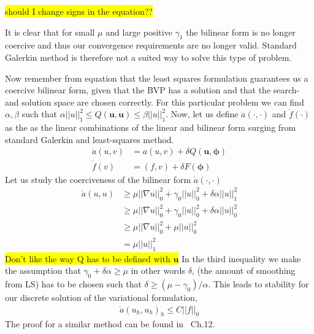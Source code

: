 \colorbox{yellow}{should I change signs in the equation?? } 


It is clear that for small $\mu$ and large positive $\gamma_1$ the bilinear form is no longer coercive and thus our convergence requirements are no longer valid. Standard Galerkin method is therefore not a suited way to solve this type of problem. 

Now remember from equation  that the least squares formulation guarantees us a coercive bilinear form, given that the BVP has a solution and that the search- and solution space are chosen correctly. For this particular problem we can find $\alpha,\beta$ such that $\alpha||u||_1^2 \leq Q(\mathbf{u},\mathbf{u}) \leq \beta||u||_1^2 $.
Now, let us define $\mathring{a}(\cdot,\cdot)$ and $\mathring{f}(\cdot)$ as the as the linear combinations of the linear and bilinear form surging from standard Galerkin and least-squares method. 
\begin{align}
	\mathring{a}(u,v) &= a(u,v) + \delta Q(\mathbf{u},\mathbf{\phi}) \\
	 \mathring{f}(v) &= (f,v) + \delta F(\mathbf{\phi}) 
	\label{eq:GLS}
\end{align}
Let us study the coerciveness of the bilinear form $\mathring{a}(\cdot,\cdot)$
\begin{align}
	\mathring{a}(u,u) &\geq \mu ||\nabla u||_0^2+\gamma_0||u||_0^2+\delta \alpha ||u||^2_1 \\
	&\geq \mu ||\nabla u||_0^2+\gamma_0||u||_0^2+\delta \alpha ||u||^2_0 \\
	&\geq \mu ||\nabla u||_0^2+\mu ||u||_0^2 \\
	&= \mu ||u||^2_1
	\label{eq:coercivity}
\end{align}
\colorbox{yellow}{Don't like the way Q has to be defined with $\mathbf{u}$}
In the third inequality we make the assumption that $\gamma_0+\delta \alpha \geq \mu $ in other words $\delta$, (the amount of smoothing from LS) has to be chosen such that $\delta \geq (\mu-\gamma_0)/\alpha$.
This leads to stability for our discrete solution of the variational formulation, 
\begin{align}
	\mathring{a}(u_h,u_h)_h \leq C ||f||_0
	\label{eq:stabilityResult}
\end{align}
The proof for a similar method can be found in~\cite{Quarteroni} Ch.12. 



